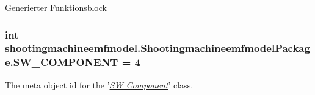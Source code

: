 Generierter Funktionsblock  \hypertarget{interfaceshootingmachineemfmodel_1_1_shootingmachineemfmodel_package_ab7ed8841e91d706d808f950aa3a7d367}{
\subsubsection[{S\-W\-\_\-\-C\-O\-M\-P\-O\-N\-E\-N\-T}]{\setlength{\rightskip}{0pt plus 5cm}int shootingmachineemfmodel.\-Shootingmachineemfmodel\-Package.\-S\-W\-\_\-\-C\-O\-M\-P\-O\-N\-E\-N\-T = 4}}\label{interfaceshootingmachineemfmodel_1_1_shootingmachineemfmodel_package_ab7ed8841e91d706d808f950aa3a7d367}
The meta object id for the '\hyperlink{classshootingmachineemfmodel_1_1impl_1_1_s_w___component_impl}{{\itshape S\-W Component}}' class.

